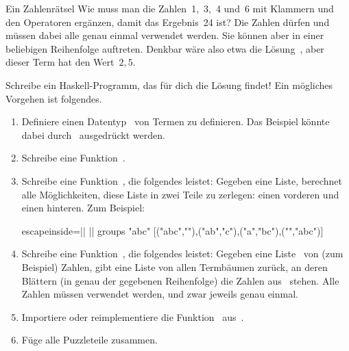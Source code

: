 \documentclass{uebblatt}
\begin{document}
\begin{aufgabe}{Ein Zahlenrätsel}
Wie muss man die Zahlen~1,~3,~4 und~6 mit Klammern und den Operatoren
\haskellinline{+ * - /} ergänzen, damit das Ergebnis~24 ist? Die Zahlen dürfen
und müssen dabei alle genau einmal verwendet werden. Sie können aber in einer
beliebigen Reihenfolge auftreten. Denkbar wäre also etwa die
Lösung~, aber dieser Term hat den Wert~$2{,}5$.

Schreibe ein Haskell-Programm, das für dich die Lösung findet! Ein mögliches
Vorgehen ist folgendes.

\begin{enumerate}
\item Definiere einen Datentyp~ von Termen zu definieren.
Das Beispiel könnte dabei durch~ ausgedrückt werden.
\item Schreibe eine Funktion~.
\item Schreibe eine Funktion~, die
folgendes leistet: Gegeben eine Liste, berechnet alle Möglichkeiten, diese Liste in zwei
Teile zu zerlegen: einen vorderen und einen hinteren. Zum Beispiel:
\begin{haskellcode*}{escapeinside=||}
|\ghci| groups "abc"
[("abc",""),("ab","c"),("a","bc"),("","abc")]
\end{haskellcode*}
\item Schreibe eine Funktion~, die
folgendes leistet: Gegeben eine Liste~ von (zum Beispiel)
Zahlen, gibt eine Liste von allen Termbäumen zurück, an deren Blättern (in
genau der gegebenen Reihenfolge) die Zahlen aus~ stehen. Alle Zahlen
müssen verwendet werden, und zwar jeweils genau einmal.
\item Importiere oder reimplementiere die Funktion~ aus~.
\item Füge alle Puzzleteile zusammen.
\end{enumerate}
\end{aufgabe}
\end{document}
